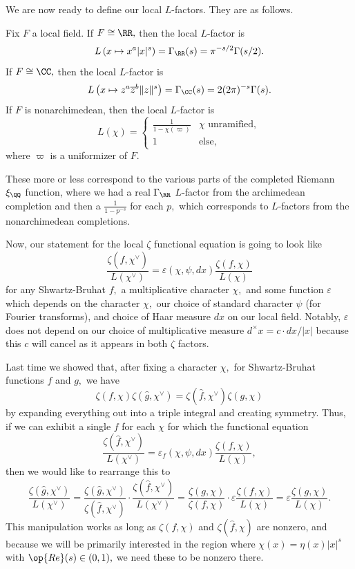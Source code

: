 We are now ready to define our local $L$-factors. They are as follows.
\begin{definition}
    Fix $F$ a local field. If $F\cong\RR,$ then the local $L$-factor is
    \[L\left(x\mapsto x^a|x|^s\right)=\Gamma_\RR(s)=\pi^{-s/2}\Gamma(s/2).\]
    If $F\cong\CC,$ then the local $L$-factor is
    \[L\left(x\mapsto z^a\overline z^b\lVert z\rVert^s\right)=\Gamma_\CC(s)=2(2\pi)^{-s}\Gamma(s).\]
    If $F$ is nonarchimedean, then the local $L$-factor is
    \[L(\chi)=\begin{cases}
        \frac1{1-\chi(\varpi)} & \chi\text{ unramified}, \\
        1 & \text{else},
    \end{cases}\]
    where $\varpi$ is a uniformizer of $F.$
\end{definition}
These more or less correspond to the various parts of the completed Riemann $\xi_\QQ$ function, where we had a real $\Gamma_\RR$ $L$-factor from the archimedean completion and then a $\frac1{1-p^{-s}}$ for each $p,$ which corresponds to $L$-factors from the nonarchimedean completions.

Now, our statement for the local $\zeta$ functional equation is going to look like
\[\frac{\zeta(\hat f,\chi^\vee)}{L(\chi^\vee)}=\varepsilon(\chi,\psi,dx)\frac{\zeta(f,\chi)}{L(\chi)}\]
for any Shwartz-Bruhat $f,$ a multiplicative character $\chi,$ and some function $\varepsilon$ which depends on the character $\chi,$ our choice of standard character $\psi$ (for Fourier transforms), and choice of Haar measure $dx$ on our local field. Notably, $\varepsilon$ does not depend on our choice of multiplicative measure $d^\times x=c\cdot dx/|x|$ because this $c$ will cancel as it appears in both $\zeta$ factors.

Last time we showed that, after fixing a character $\chi,$ for Shwartz-Bruhat functions $f$ and $g,$ we have
\[\zeta(f,\chi)\zeta(\hat g,\chi^\vee)=\zeta(\hat f,\chi^\vee)\zeta(g,\chi)\]
by expanding everything out into a triple integral and creating symmetry. Thus, if we can exhibit a single $f$ for each $\chi$ for which the functional equation
\[\frac{\zeta(\hat f,\chi^\vee)}{L(\chi^\vee)}=\varepsilon_f(\chi,\psi,dx)\frac{\zeta(f,\chi)}{L(\chi)},\]
then we would like to rearrange this to
\[\frac{\zeta(\hat g,\chi^\vee)}{L(\chi^\vee)}=\frac{\zeta(\hat g,\chi^\vee)}{\zeta(\hat f,\chi^\vee)}\cdot\frac{\zeta(\hat f,\chi^\vee)}{L(\chi^\vee)}=\frac{\zeta(g,\chi)}{\zeta(f,\chi)}\cdot\varepsilon\frac{\zeta(f,\chi)}{L(\chi)}=\varepsilon\frac{\zeta(g,\chi)}{L(\chi)}.\]
This manipulation works as long as $\zeta(f,\chi)$ and $\zeta(\hat f,\chi)$ are nonzero, and because we will be primarily interested in the region where $\chi(x)=\eta(x)|x|^s$ with $\op{Re}(s)\in(0,1),$ we need these to be nonzero there.

